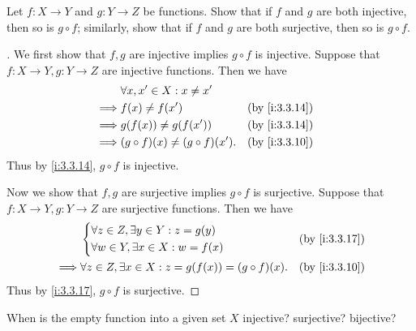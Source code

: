 \begin{ex}\label{i:ex:3.3.2}
  Let \(f : X \to Y\) and \(g : Y \to Z\) be functions.
  Show that if \(f\) and \(g\) are both injective, then so is \(g \circ f\);
  similarly, show that if \(f\) and \(g\) are both surjective, then so is \(g \circ f\).
\end{ex}

\begin{proof}[]
  We first show that \(f, g\) are injective implies \(g \circ f\) is injective.
  Suppose that \(f : X \to Y, g : Y \to Z\) are injective functions.
  Then we have
  \begin{align*}
             & \forall x, x' \in X : x \neq x'                         \\
    \implies & f(x) \neq f(x')                      &  & \by{i:3.3.14} \\
    \implies & g(f(x)) \neq g(f(x'))                &  & \by{i:3.3.14} \\
    \implies & (g \circ f)(x) \neq (g \circ f)(x'). &  & \by{i:3.3.10}
  \end{align*}
  Thus by \cref{i:3.3.14}, \(g \circ f\) is injective.

  Now we show that \(f, g\) are surjective implies \(g \circ f\) is surjective.
  Suppose that \(f : X \to Y, g : Y \to Z\) are surjective functions.
  Then we have
  \begin{align*}
             & \begin{dcases}
                 \forall z \in Z, \exists y \in Y : z = g(y) \\
                 \forall w \in Y, \exists x \in X : w = f(x)
               \end{dcases}                   &  & \by{i:3.3.17}                                   \\
    \implies & \forall z \in Z, \exists x \in X : z = g(f(x)) = (g \circ f)(x). &  & \by{i:3.3.10}
  \end{align*}
  Thus by \cref{i:3.3.17}, \(g \circ f\) is surjective.
\end{proof}

\begin{ex}\label{i:ex:3.3.3}
  When is the empty function into a given set \(X\) injective?
  surjective?
  bijective?
\end{ex}

